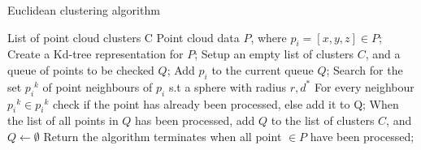 \documentclass[a4paper, 12pt]{article}
\begin{document}
\begin{sloppypar}
\begin{algorithm}[h]
    \caption{Euclidean clustering algorithm  \cite{rusu_thesis,cnn_uav}}
    \label{Chap3:Alg2}
    \begin{algorithmic}[1]
        \Ensure List of point cloud clusters C
        \Require Point cloud data $P$, where $p_i=[x,y,z] \in P$;
        \State Create a Kd-tree representation for $P$;
        \State Setup an empty list of clusters $C$, and a queue of points to be checked $Q$;
        \State Add $p_i$ to the current queue $Q$;
        \State Search for the set ${p_i}^k$ of point neighbours of $p_i$ s.t a sphere with radius $r,d^*$
        \State For every neighbour ${p_i}^k \in {p_i}^k$ check if the point has already been processed, else add it to Q;
        \EndFor
        \State When the list of all points in $Q$ has been processed, add $Q$ to the list of clusters $C$, and $Q \gets \emptyset$
        \EndFor
        \State Return the algorithm terminates when all point $\in P$ have been processed;
    \end{algorithmic}
\end{algorithm}










\clearpage
\nocite{*}
\printbibliography


\end{sloppypar}
\end{document}
